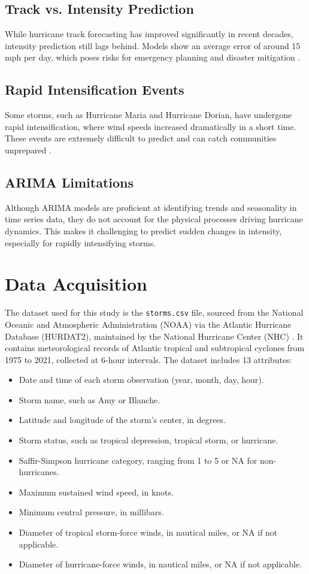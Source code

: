 \subsection{Track vs. Intensity Prediction}
While hurricane track forecasting has improved significantly in recent decades, intensity prediction still lags behind. Models show an average error of around 15 mph per day, which poses risks for emergency planning and disaster mitigation \cite{de2019evaluation}.

\subsection{Rapid Intensification Events}
Some storms, such as Hurricane Maria and Hurricane Dorian, have undergone rapid intensification, where wind speeds increased dramatically in a short time. These events are extremely difficult to predict and can catch communities unprepared \cite{kaplan2003large}.

\subsection{ARIMA Limitations}
Although ARIMA models are proficient at identifying trends and seasonality in time series data, they do not account for the physical processes driving hurricane dynamics. This makes it challenging to predict sudden changes in intensity, especially for rapidly intensifying storms.

\section{Data Acquisition}
The dataset used for this study is the \texttt{storms.csv} file, sourced from the National Oceanic and Atmospheric Administration (NOAA) via the Atlantic Hurricane Database (HURDAT2), maintained by the National Hurricane Center (NHC) \cite{noaa2021hurdat2, kaggle2021hurricane}. It contains meteorological records of Atlantic tropical and subtropical cyclones from 1975 to 2021, collected at 6-hour intervals. The dataset includes 13 attributes:

\begin{itemize}
	\item Date and time of each storm observation (year, month, day, hour).
	\item Storm name, such as Amy or Blanche.
	\item Latitude and longitude of the storm’s center, in degrees.
	\item Storm status, such as tropical depression, tropical storm, or hurricane.
	\item Saffir-Simpson hurricane category, ranging from 1 to 5 or NA for non-hurricanes.
	\item Maximum sustained wind speed, in knots.
	\item Minimum central pressure, in millibars.
	\item Diameter of tropical storm-force winds, in nautical miles, or NA if not applicable.
	\item Diameter of hurricane-force winds, in nautical miles, or NA if not applicable.
\end{itemize}


